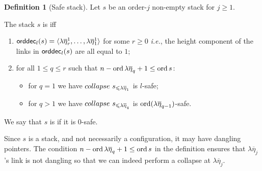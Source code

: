 \documentclass[a4paper]{article}[12pt]
\theoremstyle{remark}
\theoremstyle{definition}
\newtheorem{definition}{Definition}[section]
\newcommand\orddec{{\sf orddec}}
\begin{document}
\begin{definition}[Safe stack]
\label{dfn:safestack} Let $s$ be an order-$j$ non-empty stack for $j\geq1$.

The stack $s$ is  iff
    \begin{enumerate}[1.]
    \item $\orddec_l(s) = \langle \lambda \overline\eta_r^1, \ldots ,
    \lambda \overline{\eta}_1^1 \rangle$ for some $r\geq 0$ {\it i.e.}, the height component of the links in $\orddec_l(s)$ are all equal to $1$;

    \item for all $1 \leq q \leq r$ such that $n-\mathop{\mathrm{ord}}{\lambda \overline\eta_q}+1 \leq \mathop{\mathrm{ord}}{s}$:
    \begin{itemize}
    \item for $q = 1$ we have $collapse~s_{\leqslant \lambda\overline\eta_1}$ is $l$-safe;
    \item for $q>1$ we have $collapse~s_{\leqslant \lambda\overline\eta_q}$ is $\mathop{\mathrm{ord}}(\lambda \overline\eta_{q-1})$-safe.
    \end{itemize}
    \end{enumerate}

We say that $s$ is  if it is $0$-safe.
\end{definition}


Since $s$ is a stack, and not necessarily a configuration, it may have dangling pointers.
The condition $n-\mathop{\mathrm{ord}}{\lambda \overline\eta_q}+1 \leq \mathop{\mathrm{ord}}{s}$ in the definition ensures that
$\lambda\overline\eta_j$'s link is not dangling so that we can indeed perform a collapse at $\lambda\overline\eta_j$.
\end{document}
